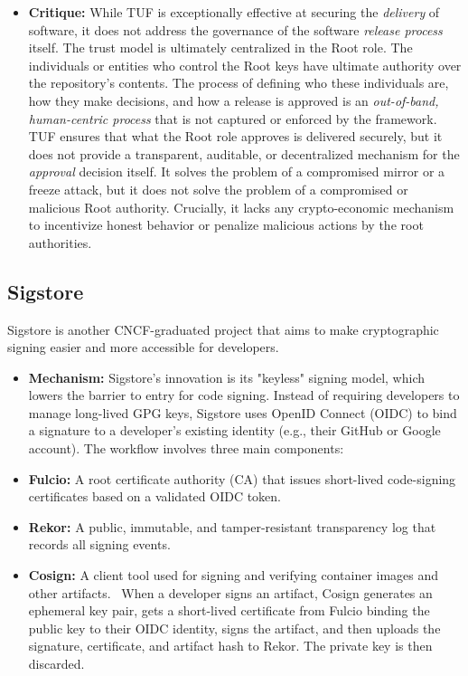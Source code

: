 \documentclass{article}
\begin{document}
\begin{itemize}
\item \textbf{Critique:} While TUF is exceptionally effective at securing the \emph{delivery} of software, it does not address the governance of the software \emph{release process} itself. The trust model is ultimately centralized in the Root role. The individuals or entities who control the Root keys have ultimate authority over the repository's contents. The process of defining who these individuals are, how they make decisions, and how a release is approved is an \emph{out-of-band, human-centric process} that is not captured or enforced by the framework.~\cite{tufspec} TUF ensures that what the Root role approves is delivered securely, but it does not provide a transparent, auditable, or decentralized mechanism for the \emph{approval} decision itself. It solves the problem of a compromised mirror or a freeze attack, but it does not solve the problem of a compromised or malicious Root authority. Crucially, it lacks any crypto-economic mechanism to incentivize honest behavior or penalize malicious actions by the root authorities.
\end{itemize}

\subsection{Sigstore}

Sigstore is another CNCF-graduated project that aims to make cryptographic signing easier and more accessible for developers.~\cite{newman2022sigstore}

\begin{itemize}
\item \textbf{Mechanism:} Sigstore's innovation is its "keyless" signing model, which lowers the barrier to entry for code signing. Instead of requiring developers to manage long-lived GPG keys, Sigstore uses OpenID Connect (OIDC) to bind a signature to a developer's existing identity (e.g., their GitHub or Google account). The workflow involves three main components:
\end{itemize}

\begin{itemize}
\item \textbf{Fulcio:} A root certificate authority (CA) that issues short-lived code-signing certificates based on a validated OIDC token.
\item \textbf{Rekor:} A public, immutable, and tamper-resistant transparency log that records all signing events.
\item \textbf{Cosign:} A client tool used for signing and verifying container images and other artifacts.~\cite{newman2022sigstore} When a developer signs an artifact, Cosign generates an ephemeral key pair, gets a short-lived certificate from Fulcio binding the public key to their OIDC identity, signs the artifact, and then uploads the signature, certificate, and artifact hash to Rekor. The private key is then discarded.~\cite{newman2022sigstore}
\end{itemize}
\end{document}
